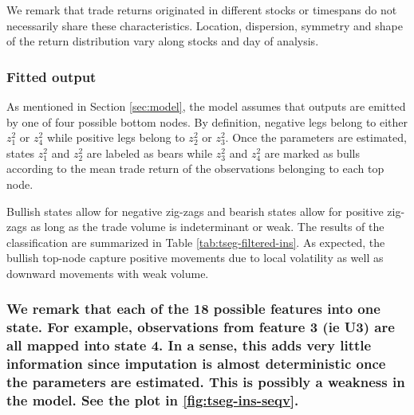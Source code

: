 \documentclass[]{article}
\begin{document}
We remark that trade returns originated in different stocks or timespans
do not necessarily share these characteristics. Location, dispersion,
symmetry and shape of the return distribution vary along stocks and day
of analysis.

\subsubsection{Fitted output}\label{fitted-output}

As mentioned in Section \ref{sec:model}, the model assumes that outputs
are emitted by one of four possible bottom nodes. By definition,
negative legs belong to either \(z_{1}^2\) or \(z_{4}^2\) while positive
legs belong to \(z_{2}^2\) or \(z_{3}^2\). Once the parameters are
estimated, states \(z_{1}^2\) and \(z_{2}^2\) are labeled as bears while
\(z_{3}^2\) and \(z_{4}^2\) are marked as bulls according to the mean
trade return of the observations belonging to each top node.

Bullish states allow for negative zig-zags and bearish states allow for
positive zig-zags as long as the trade volume is indeterminant or weak.
The results of the classification are summarized in Table
\ref{tab:tseg-filtered-ins}. As expected, the bullish top-node capture
positive movements due to local volatility as well as downward movements
with weak volume.

\subsubsection{\texorpdfstring{We remark that each of the 18 possible
features into one state. For example, observations from feature 3 (ie
U3) are all mapped into state 4. In a sense, this adds very little
information since imputation is almost deterministic once the parameters
are estimated. This is possibly a weakness in the model. See the plot in
\ref{fig:tseg-ins-seqv}.}{We remark that each of the 18 possible features into one state. For example, observations from feature 3 (ie U3) are all mapped into state 4. In a sense, this adds very little information since imputation is almost deterministic once the parameters are estimated. This is possibly a weakness in the model. See the plot in .}}\label{we-remark-that-each-of-the-18-possible-features-into-one-state.-for-example-observations-from-feature-3-ie-u3-are-all-mapped-into-state-4.-in-a-sense-this-adds-very-little-information-since-imputation-is-almost-deterministic-once-the-parameters-are-estimated.-this-is-possibly-a-weakness-in-the-model.-see-the-plot-in-.}
\end{document}
